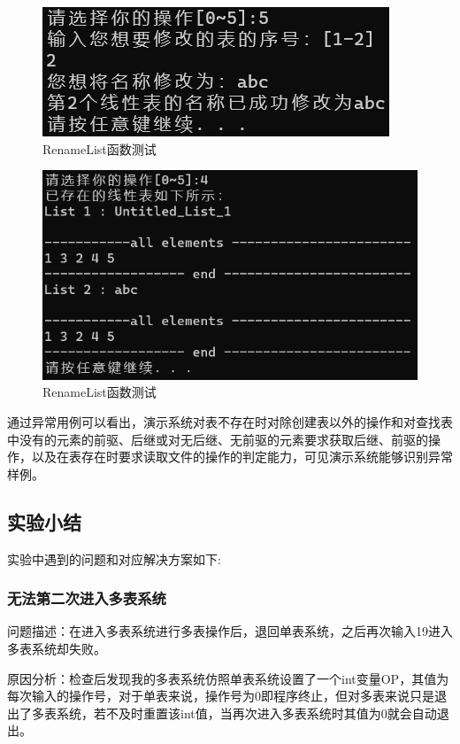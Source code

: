\documentclass[supercite]{Experimental_Report}
\theoremstyle{definition}
\begin{document}
\begin{enumerate}
	\begin{figure}[H] %
		\begin{center}
			\includegraphics[width=0.5\linewidth]{images/linklist/19-5.png}
			\caption{ RenameList函数测试}
			\label{fig1-20-1}
		\end{center}
	\end{figure}
\begin{figure}[H] %
	\begin{center}
		\includegraphics[width=0.5\linewidth]{images/linklist/19-5-4.png}
		\caption{ RenameList函数测试}
		\label{fig1-20-2}
	\end{center}
\end{figure}
\end{enumerate}

\quad 通过异常用例可以看出，演示系统对表不存在时对除创建表以外的操作和对查找表中没有的元素的前驱、后继或对无后继、无前驱的元素要求获取后继、前驱的操作，以及在表存在时要求读取文件的操作的判定能力，可见演示系统能够识别异常样例。

\subsection{实验小结}
实验中遇到的问题和对应解决方案如下:\par
\subsubsection{无法第二次进入多表系统}
问题描述：在进入多表系统进行多表操作后，退回单表系统，之后再次输入19进入多表系统却失败。\par

原因分析：检查后发现我的多表系统仿照单表系统设置了一个int变量OP，其值为每次输入的操作号，对于单表来说，操作号为0即程序终止，但对多表来说只是退出了多表系统，若不及时重置该int值，当再次进入多表系统时其值为0就会自动退出。\par
\end{document}

